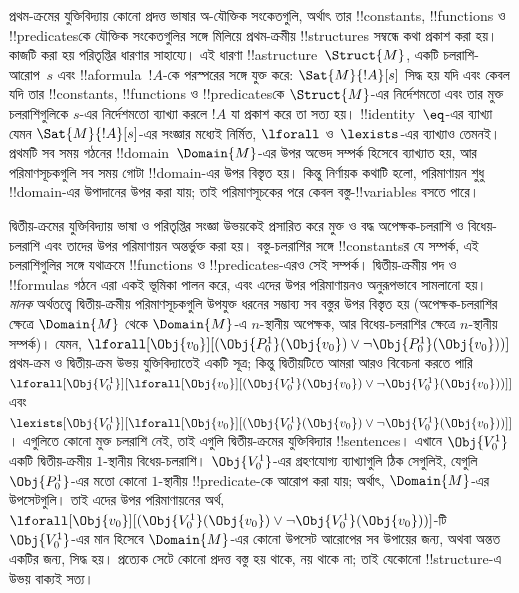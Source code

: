 \documentclass[../../../include/open-logic-section]{subfiles}
\begin{document}


প্রথম-ক্রমের যুক্তিবিদ্যায় কোনো প্রদত্ত ভাষার অ-যৌক্তিক সংকেতগুলি,
অর্থাৎ তার !!{constant}s, !!{function}s ও !!{predicate}sকে যৌক্তিক
সংকেতগুলির সঙ্গে মিলিয়ে প্রথম-ক্রমীয় !!{structure}s সম্বন্ধে কথা
প্রকাশ করা হয়। কাজটি করা হয় পরিতৃপ্তির ধারণার সাহায্যে। এই ধারণা
!!a{structure}~$\Struct{M}$, একটি চলরাশি-আরোপ~$s$ এবং
!!a{formula}~$!A$-কে পরস্পরের সঙ্গে যুক্ত করে: $\Sat{M}{!A}[s]$ সিদ্ধ
হয় যদি এবং কেবল যদি তার !!{constant}s, !!{function}s ও
!!{predicate}sকে $\Struct{M}$-এর নির্দেশমতো এবং তার মুক্ত চলরাশিগুলিকে
$s$-এর নির্দেশমতো ব্যাখ্যা করলে $!A$ যা প্রকাশ করে তা সত্য হয়।
!!{identity}~$\eq$-এর ব্যাখ্যা যেমন $\Sat{M}{!A}[s]$-এর সংজ্ঞার মধ্যেই
নির্মিত, $\lforall$ ও~$\lexists$-এর ব্যাখ্যাও তেমনই। প্রথমটি সব সময়
গঠনের !!{domain}~$\Domain{M}$-এর উপর অভেদ সম্পর্ক হিসেবে ব্যাখ্যাত হয়,
আর পরিমাণসূচকগুলি সব সময় গোটা !!{domain}-এর উপর বিস্তৃত হয়। কিন্তু
নির্ণায়ক কথাটি হলো, পরিমাণায়ন শুধু !!{domain}-এর উপাদানের উপর করা
যায়; তাই পরিমাণসূচকের পরে কেবল বস্তু-!!{variable}s বসতে পারে।

দ্বিতীয়-ক্রমের যুক্তিবিদ্যায় ভাষা ও পরিতৃপ্তির সংজ্ঞা উভয়কেই প্রসারিত
করে মুক্ত ও বদ্ধ অপেক্ষক-চলরাশি ও বিধেয়-চলরাশি এবং তাদের উপর পরিমাণায়ন
অন্তর্ভুক্ত করা হয়। বস্তু-চলরাশির সঙ্গে !!{constant}sর যে সম্পর্ক,
এই চলরাশিগুলির সঙ্গে যথাক্রমে !!{function}s ও !!{predicate}s-এরও সেই
সম্পর্ক। দ্বিতীয়-ক্রমীয় পদ ও !!{formula}s গঠনে এরা একই ভূমিকা পালন
করে, এবং এদের উপর পরিমাণায়নও অনুরূপভাবে সামলানো হয়। \emph{মানক}
অর্থতত্ত্বে দ্বিতীয়-ক্রমীয় পরিমাণসূচকগুলি উপযুক্ত ধরনের সম্ভাব্য সব
বস্তুর উপর বিস্তৃত হয় (অপেক্ষক-চলরাশির ক্ষেত্রে $\Domain{M}$ থেকে
$\Domain{M}$-এ $n$-স্থানীয় অপেক্ষক, আর বিধেয়-চলরাশির ক্ষেত্রে
$n$-স্থানীয় সম্পর্ক)। যেমন,
$\lforall[\Obj{v_0}][(\Obj{P^1_0}(\Obj{v_0}) \lor \lnot
  \Obj{P^1_0}(\Obj{v_0}))]$ প্রথম-ক্রম ও দ্বিতীয়-ক্রম উভয়
যুক্তিবিদ্যাতেই একটি সূত্র; কিন্তু দ্বিতীয়টিতে আমরা আরও বিবেচনা করতে
পারি
$\lforall[\Obj{V^1_0}][\lforall[\Obj{v_0}][(\Obj{V^1_0}(\Obj{v_0}) \lor
    \lnot \Obj{V^1_0}(\Obj{v_0}))]]$ এবং
$\lexists[\Obj{V^1_0}][\lforall[\Obj{v_0}][(\Obj{V^1_0}(\Obj{v_0}) \lor
    \lnot \Obj{V^1_0}(\Obj{v_0}))]]$। এগুলিতে কোনো মুক্ত চলরাশি নেই,
তাই এগুলি দ্বিতীয়-ক্রমের যুক্তিবিদ্যার !!{sentence}s। এখানে
$\Obj{V^1_0}$ একটি দ্বিতীয়-ক্রমীয় $1$-স্থানীয় বিধেয়-চলরাশি।
$\Obj{V^1_0}$-এর গ্রহণযোগ্য ব্যাখ্যাগুলি ঠিক সেগুলিই, যেগুলি
$\Obj{P^1_0}$-এর মতো কোনো $1$-স্থানীয় !!{predicate}-কে আরোপ করা যায়;
অর্থাৎ, $\Domain{M}$-এর উপসেটগুলি। তাই এদের উপর পরিমাণায়নের অর্থ,
$\lforall[\Obj{v_0}][(\Obj{V^1_0}(\Obj{v_0}) \lor \lnot
  \Obj{V^1_0}(\Obj{v_0}))]$-টি $\Obj{V^1_0}$-এর মান হিসেবে
$\Domain{M}$-এর কোনো উপসেট আরোপের সব উপায়ের জন্য, অথবা অন্তত একটির
জন্য, সিদ্ধ হয়। প্রত্যেক সেটে কোনো প্রদত্ত বস্তু হয় থাকে, নয় থাকে
না; তাই যেকোনো !!{structure}-এ উভয় বাক্যই সত্য।
\end{document}
